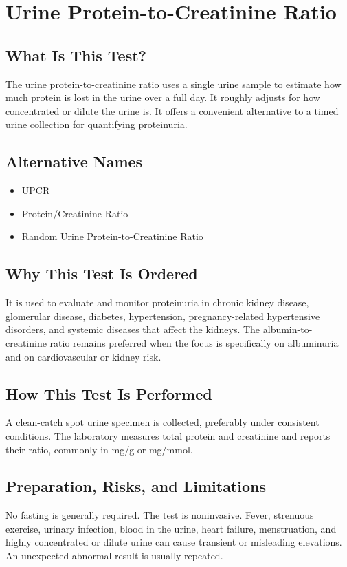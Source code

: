 \chapter{Urine Protein-to-Creatinine Ratio}

\section*{What Is This Test?}
The urine protein-to-creatinine ratio uses a single urine sample to estimate how much protein is lost in the urine over a full day. It roughly adjusts for how concentrated or dilute the urine is. It offers a convenient alternative to a timed urine collection for quantifying proteinuria.

\section*{Alternative Names}
\begin{itemize}
  \item UPCR
  \item Protein/Creatinine Ratio
  \item Random Urine Protein-to-Creatinine Ratio
\end{itemize}
\section*{Why This Test Is Ordered}
It is used to evaluate and monitor proteinuria in chronic kidney disease, glomerular disease, diabetes, hypertension, pregnancy-related hypertensive disorders, and systemic diseases that affect the kidneys. The albumin-to-creatinine ratio remains preferred when the focus is specifically on albuminuria and on cardiovascular or kidney risk.

\section*{How This Test Is Performed}
A clean-catch spot urine specimen is collected, preferably under consistent conditions. The laboratory measures total protein and creatinine and reports their ratio, commonly in mg/g or mg/mmol.

\section*{Preparation, Risks, and Limitations}
No fasting is generally required. The test is noninvasive. Fever, strenuous exercise, urinary infection, blood in the urine, heart failure, menstruation, and highly concentrated or dilute urine can cause transient or misleading elevations. An unexpected abnormal result is usually repeated.

